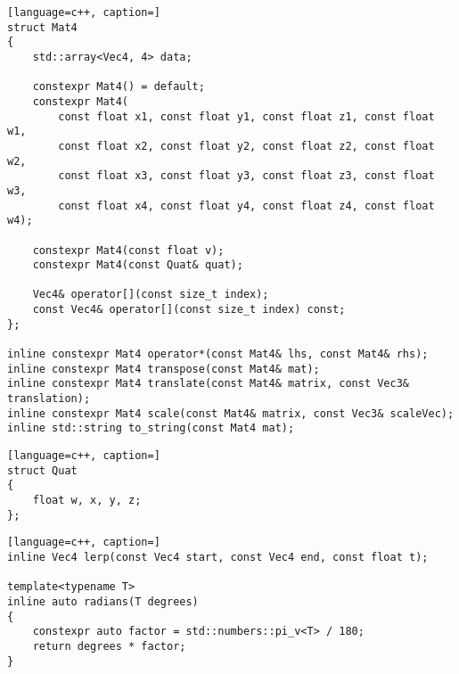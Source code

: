 \begin{lstlisting}[language=c++, caption=]
struct Mat4
{
    std::array<Vec4, 4> data;

    constexpr Mat4() = default;
    constexpr Mat4(
        const float x1, const float y1, const float z1, const float w1,
        const float x2, const float y2, const float z2, const float w2,
        const float x3, const float y3, const float z3, const float w3,
        const float x4, const float y4, const float z4, const float w4);

    constexpr Mat4(const float v);
    constexpr Mat4(const Quat& quat);

    Vec4& operator[](const size_t index);
    const Vec4& operator[](const size_t index) const;
};

inline constexpr Mat4 operator*(const Mat4& lhs, const Mat4& rhs);
inline constexpr Mat4 transpose(const Mat4& mat);
inline constexpr Mat4 translate(const Mat4& matrix, const Vec3& translation);
inline constexpr Mat4 scale(const Mat4& matrix, const Vec3& scaleVec);
inline std::string to_string(const Mat4 mat);
\end{lstlisting}

\begin{lstlisting}[language=c++, caption=]
struct Quat
{
    float w, x, y, z;
};
\end{lstlisting}

\begin{lstlisting}[language=c++, caption=]
inline Vec4 lerp(const Vec4 start, const Vec4 end, const float t);

template<typename T>
inline auto radians(T degrees)
{
    constexpr auto factor = std::numbers::pi_v<T> / 180;
    return degrees * factor;
}
\end{lstlisting}
